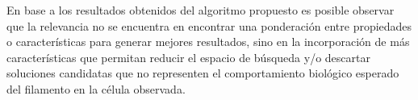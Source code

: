 

En base a los resultados obtenidos del algoritmo propuesto es posible observar que la relevancia no se encuentra en encontrar una ponderaci\'on entre propiedades o caracter\'isticas para generar mejores resultados, sino en la incorporaci\'on de m\'as caracter\'isticas que permitan reducir el espacio de b\'usqueda y/o descartar soluciones candidatas que no representen el comportamiento biol\'ogico esperado del filamento en la c\'elula observada.

